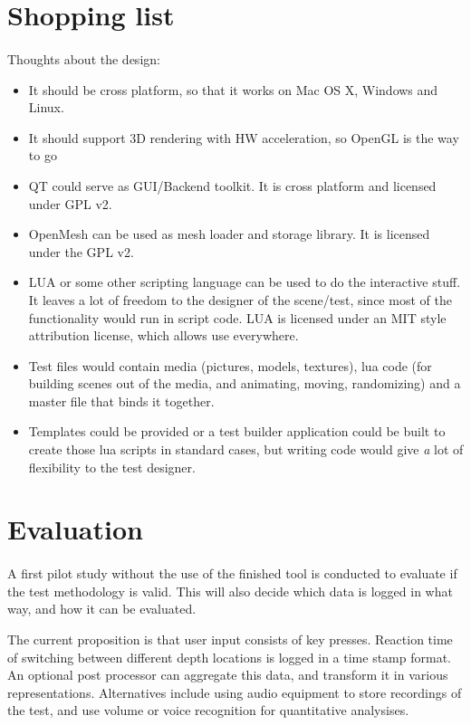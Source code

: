 \documentclass[11pt]{scrartcl}
\begin{document}
\begin{multicols}{2}
\section{Shopping list}
\paragraph{}
Thoughts about the design:

\begin{itemize}
\item It should be cross platform, so that it works on Mac OS X, Windows and Linux.
\item It should support 3D rendering with HW acceleration, so OpenGL is the way to go
\item QT could serve as GUI/Backend toolkit. It is cross platform and licensed under GPL v2.
\item OpenMesh can be used as mesh loader and storage library. It is licensed under the GPL v2.
\item LUA or some other scripting language can be used to do the interactive stuff. It leaves a lot of freedom to the designer of the scene/test, since most of the functionality would run in script code. LUA is licensed under an MIT style attribution license, which allows use everywhere.
\item Test files would contain media (pictures, models, textures), lua code (for building scenes out of the media, and animating, moving, randomizing) and a master file that binds it together.
\item Templates could be provided or a test builder application could be built to create those lua scripts in standard cases, but writing code would give {\textit a lot} of flexibility to the test designer.
\end{itemize}

\section{Evaluation}
\paragraph{}
A first pilot study without the use of the finished tool is conducted to evaluate if the test methodology is valid. This will also decide which data is logged in what way, and how it can be evaluated.

The current proposition is that user input consists of key presses. Reaction time of switching between different depth locations is logged in a time stamp format. An optional post processor can aggregate this data, and transform it in various representations. Alternatives include using audio equipment to store recordings of the test, and use volume or voice recognition for quantitative analysises. 


\end{multicols}
\end{document}
